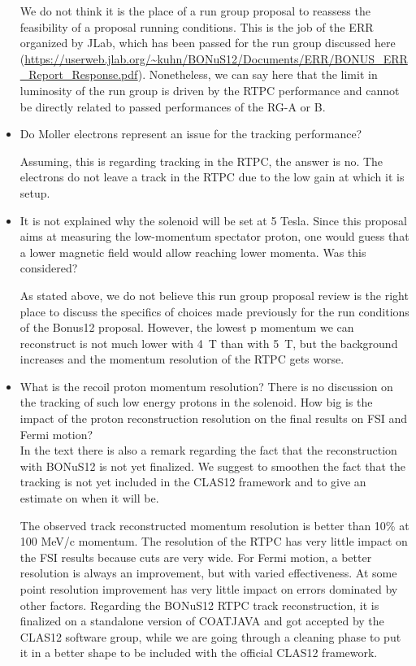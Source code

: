 \begin{itemize}
{\color{red} We do not think it is the place of a run group proposal to 
        reassess the feasibility of a proposal running conditions. This is the 
        job of the ERR organized by JLab, which has been passed for the run 
        group discussed here 
        (\url{https://userweb.jlab.org/~kuhn/BONuS12/Documents/ERR/BONUS_ERR_Report_Response.pdf}).  
        Nonetheless, we can say here that the limit in luminosity of the run 
        group is driven by the RTPC performance and cannot be directly related 
        to passed performances of the RG-A or B.}

 \item Do Moller electrons represent an issue for the tracking performance? 

 {\color{red} Assuming, this is regarding tracking in the RTPC, the answer is 
        no. The electrons do not leave a track in the RTPC due to the low gain 
        at which it is setup.}

 \item It is not explained why the solenoid will be set at 5 Tesla. Since this 
    proposal aims at measuring the low-momentum spectator proton, one would 
        guess that a lower magnetic field would allow reaching lower momenta.  
        Was this considered?
 
{\color{red} As stated above, we do not believe this run group proposal review 
        is the right place to discuss the specifics of choices made previously 
        for the run conditions of the Bonus12 proposal. However, the lowest p 
        momentum we can reconstruct is not much lower with 4~T than with 5~T, 
        but the background increases and the momentum resolution of the RTPC 
        gets worse.}


\item What is the recoil proton momentum resolution? There is no discussion on 
   the tracking of such low energy protons in the solenoid. How big is the 
   impact of the proton reconstruction resolution on the final results on FSI 
   and Fermi motion?\\In the text there is also a remark regarding the fact 
   that the reconstruction with BONuS12 is not yet finalized. We suggest to 
   smoothen the fact that the tracking is not yet included in the CLAS12 
   framework and to give an estimate on when it will be.
 
{\color{red} The observed track reconstructed momentum resolution is better 
than 10\% at 100 MeV/c momentum. The resolution of the RTPC has very little 
impact on the FSI results because cuts are very wide. For Fermi motion, a 
better resolution is always an improvement, but with varied effectiveness. At 
some point resolution improvement has very little impact on errors dominated by 
other factors. Regarding the BONuS12 RTPC track reconstruction, it is finalized 
on a standalone version of COATJAVA and got accepted by the CLAS12 software 
group, while we are going through a cleaning phase to put it in a better shape 
to be included with the official CLAS12 framework.}


\end{itemize}
